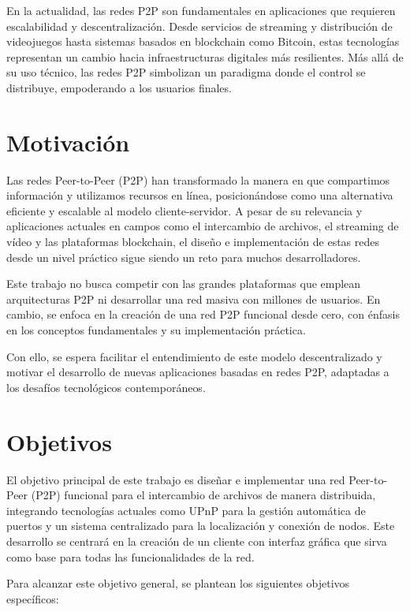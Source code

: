 En la actualidad, las redes P2P son fundamentales en aplicaciones que requieren escalabilidad y descentralización.
Desde servicios de streaming y distribución de videojuegos hasta sistemas basados en blockchain como Bitcoin,
estas tecnologías representan un cambio hacia infraestructuras digitales más resilientes.
Más allá de su uso técnico, las redes P2P simbolizan un paradigma donde el control se distribuye, empoderando a los usuarios finales.



\section{Motivación}

Las redes Peer-to-Peer (P2P) han transformado la manera en que compartimos información y utilizamos recursos en línea,
posicionándose como una alternativa eficiente y escalable al modelo cliente-servidor.
A pesar de su relevancia y aplicaciones actuales en campos como el intercambio de archivos, el streaming de vídeo y las plataformas blockchain,
el diseño e implementación de estas redes desde un nivel práctico sigue siendo un reto para muchos desarrolladores.

Este trabajo no busca competir con las grandes plataformas que emplean arquitecturas P2P ni desarrollar una red masiva con millones de usuarios.
En cambio, se enfoca en la creación de una red P2P funcional desde cero, con énfasis en los conceptos fundamentales y su implementación práctica.

Con ello, se espera facilitar el entendimiento de este modelo descentralizado y motivar el desarrollo de nuevas aplicaciones basadas en redes P2P,
adaptadas a los desafíos tecnológicos contemporáneos.


\section{Objetivos}

El objetivo principal de este trabajo es diseñar e implementar una red Peer-to-Peer (P2P) funcional para el intercambio de archivos de manera distribuida,
integrando tecnologías actuales como UPnP para la gestión automática de puertos y un sistema centralizado para la localización y conexión de nodos.
Este desarrollo se centrará en la creación de un cliente con interfaz gráfica que sirva como base para todas las funcionalidades de la red.

Para alcanzar este objetivo general, se plantean los siguientes objetivos específicos:

